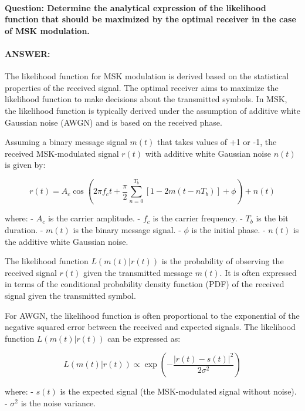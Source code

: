 \documentclass[colorlinks,11pt,a4paper,normalphoto,withhyper,ragged2e]{altareport}
\begin{document}
				
				
				
				
				
				
				\paragraph{Question: Determine the analytical expression of the likelihood function that should be maximized by the optimal receiver in the case of MSK modulation.}
				\paragraph{ANSWER:}
				
				
				The likelihood function for MSK modulation is derived based on the statistical properties of the received signal. The optimal receiver aims to maximize the likelihood function to make decisions about the transmitted symbols. In MSK, the likelihood function is typically derived under the assumption of additive white Gaussian noise (AWGN) and is based on the received phase.
				
				Assuming a binary message signal \(m(t)\) that takes values of +1 or -1, the received MSK-modulated signal \(r(t)\) with additive white Gaussian noise \(n(t)\) is given by:
				
				\[ r(t) = A_c \cos\left(2\pi f_c t + \frac{\pi}{2}\sum_{n=0}^{T_b}\left[1-2m(t-nT_b)\right] + \phi\right) + n(t) \]
				
				where:
				- \(A_c\) is the carrier amplitude.
				- \(f_c\) is the carrier frequency.
				- \(T_b\) is the bit duration.
				- \(m(t)\) is the binary message signal.
				- \(\phi\) is the initial phase.
				- \(n(t)\) is the additive white Gaussian noise.
				
				The likelihood function \(L(m(t)|r(t))\) is the probability of observing the received signal \(r(t)\) given the transmitted message \(m(t)\). It is often expressed in terms of the conditional probability density function (PDF) of the received signal given the transmitted symbol.
				
				For AWGN, the likelihood function is often proportional to the exponential of the negative squared error between the received and expected signals. The likelihood function \(L(m(t)|r(t))\) can be expressed as:
				
				\[ L(m(t)|r(t)) \propto \exp\left(-\frac{|r(t) - s(t)|^2}{2\sigma^2}\right) \]
				
				where:
				- \(s(t)\) is the expected signal (the MSK-modulated signal without noise).
				- \(\sigma^2\) is the noise variance.
				
\end{document}
